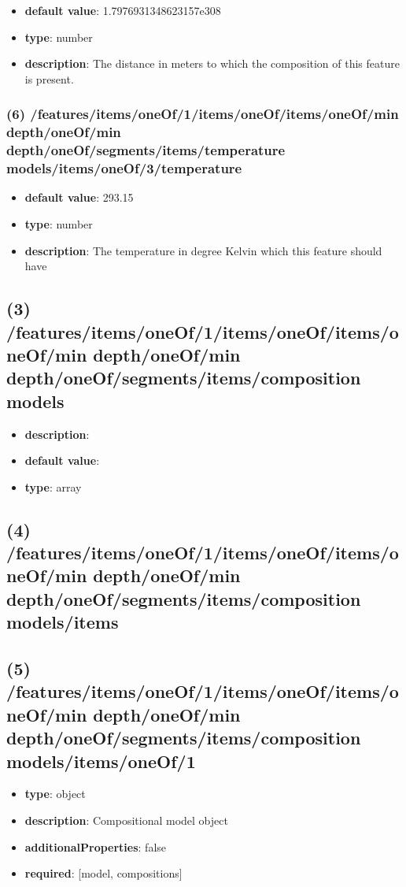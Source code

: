 \begin{itemize}[leftmargin=6em]\item {\bf default value}: 1.7976931348623157e308
\item {\bf type}: number
\item {\bf description}: The distance in meters to which the composition of this feature is present.
\end{itemize}\subsubsection{(6) /features/items/oneOf/1/items/oneOf/items/oneOf/min depth/oneOf/min depth/oneOf/segments/items/temperature models/items/oneOf/3/temperature}
\begin{itemize}[leftmargin=6em]\item {\bf default value}: 293.15
\item {\bf type}: number
\item {\bf description}: The temperature in degree Kelvin which this feature should have
\end{itemize}\subsection{(3) /features/items/oneOf/1/items/oneOf/items/oneOf/min depth/oneOf/min depth/oneOf/segments/items/composition models}
\begin{itemize}[leftmargin=3em]\item {\bf description}: 
\item {\bf default value}: 
\item {\bf type}: array
\end{itemize}\subsection{(4) /features/items/oneOf/1/items/oneOf/items/oneOf/min depth/oneOf/min depth/oneOf/segments/items/composition models/items}

\subsection{(5) /features/items/oneOf/1/items/oneOf/items/oneOf/min depth/oneOf/min depth/oneOf/segments/items/composition models/items/oneOf/1}
\begin{itemize}[leftmargin=5em]\item {\bf type}: object
\item {\bf description}: Compositional model object
\item {\bf additionalProperties}: false
\item {\bf required}: [model, compositions]\end{itemize}
